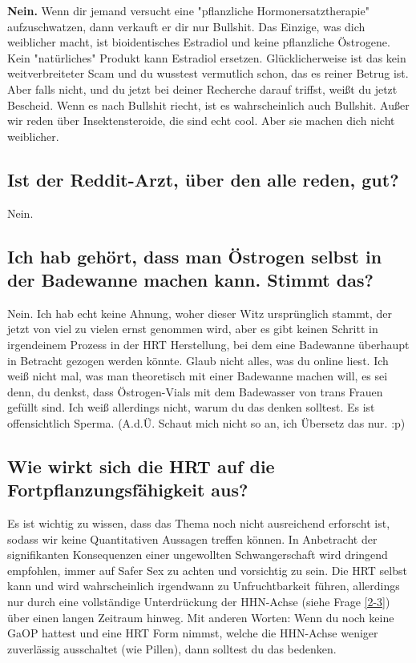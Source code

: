 \documentclass{article}
\begin{document}
\textbf{Nein.} Wenn dir jemand versucht eine "pflanzliche Hormonersatztherapie" aufzuschwatzen, dann verkauft er dir nur Bullshit. Das Einzige, was dich weiblicher macht, ist bioidentisches Estradiol und keine pflanzliche Östrogene. Kein "natürliches" Produkt kann Estradiol ersetzen. Glücklicherweise ist das kein weitverbreiteter Scam und du wusstest vermutlich schon, das es reiner Betrug ist. Aber falls nicht, und du jetzt bei deiner Recherche darauf triffst, weißt du jetzt Bescheid. Wenn es nach Bullshit riecht, ist es wahrscheinlich auch Bullshit. Außer wir reden über Insektensteroide, die sind echt cool. Aber sie machen dich nicht weiblicher.

\subsection{Ist der Reddit-Arzt, über den alle reden, gut?}

Nein.

\subsection{Ich hab gehört, dass man Östrogen selbst in der Badewanne machen kann. Stimmt das?}

Nein. Ich hab echt keine Ahnung, woher dieser Witz ursprünglich stammt, der jetzt von viel zu vielen ernst genommen wird, aber es gibt keinen Schritt in irgendeinem Prozess in der HRT Herstellung, bei dem eine Badewanne überhaupt in Betracht gezogen werden könnte. Glaub nicht alles, was du online liest. Ich weiß nicht mal, was man theoretisch mit einer Badewanne machen will, es sei denn, du denkst, dass Östrogen-Vials mit dem Badewasser von trans Frauen gefüllt sind. Ich weiß allerdings nicht, warum du das denken solltest. Es ist offensichtlich Sperma. (A.d.Ü. Schaut mich nicht so an, ich Übersetz das nur. :p)

\subsection{Wie wirkt sich die HRT auf die Fortpflanzungsfähigkeit aus?}\label{11-42}

Es ist wichtig zu wissen, dass das Thema noch nicht ausreichend erforscht ist, sodass wir keine Quantitativen Aussagen treffen können. In Anbetracht der signifikanten Konsequenzen einer ungewollten Schwangerschaft wird dringend empfohlen, immer auf Safer Sex zu achten und vorsichtig zu sein. Die HRT selbst kann und wird wahrscheinlich irgendwann zu Unfruchtbarkeit führen, allerdings nur durch eine vollständige Unterdrückung der HHN-Achse (siehe Frage \ref{2-3}) über einen langen Zeitraum hinweg. Mit anderen Worten: Wenn du noch keine GaOP hattest und eine HRT Form nimmst, welche die HHN-Achse weniger zuverlässig ausschaltet (wie Pillen), dann solltest du das bedenken.
\end{document}
